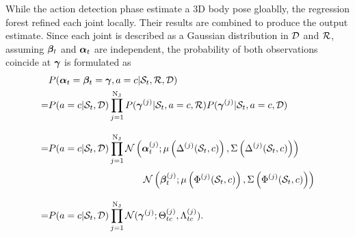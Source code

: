 While the action detection phase estimate a 3D body pose gloablly, the regression forest refined each joint locally. Their results are combined to produce the output estimate. Since each joint is described as a Gaussian distribution in $\mathcal{D}$ and $\mathcal{R}$, assuming $\boldsymbol{\beta}_{t}$ and $\boldsymbol{\alpha}_{t}$ are independent, the probability of both observations coincide at $\boldsymbol{\gamma}$ is formulated as
\begin{equation}
	\label{eqn/body/combine}
	\begin{aligned}
		& P( \bodyposead_{\timenow}=\bodyposepr_{\timenow}=\bodyposez, \action=c| \snippetnow, \forestr, \forestd)\\ 
		= & P(\action=c | \snippetnow, \forestd) \prod_{j = 1}^{\njoints} P( \bodyposez^{(j)} | \snippetnow, \action=c, \forestr) P( \bodyposez^{(j)}  | \snippetnow, \action=c, \forestd) \\[3mm]
		= &  P(\action = c | \snippetnow, \forestd) \prod_{j= 1} ^{\njoints}
		\normdist\left(\bodyposead^{(j)}_{\timenow}; \mu\left(\toffsetfunc^{(j)}(\snippetnow,c)\right), \Sigma\left(\toffsetfunc^{(j)}(\snippetnow,c)\right)\right) \\[1mm]
		& \hspace{35mm} \normdist\left(\bodyposepr_{\timenow}^{(j)};\mu\left(\Phi^{(j)}(\snippetnow, c)\right),\Sigma\left(\Phi^{(j)}(\snippetnow,c)\right)\right)\\[3mm]
		= &  P(\action=c | \snippetnow, \forestd) \prod_{j = 1}^{\njoints} \normdist(\bodyposez^{(j)}; \finalbodypose^{(j)}_{\timenow c}, \finalvariance^{(j)}_{\timenow c}).
	\end{aligned}
\end{equation} 

